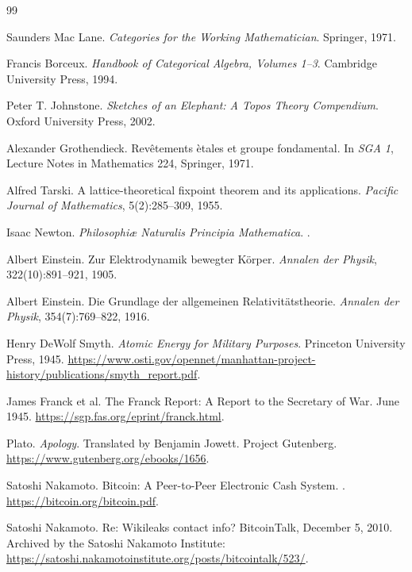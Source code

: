 \documentclass[11pt]{article}
\theoremstyle{definition}
\theoremstyle{plain}
\begin{document}
\begin{thebibliography}{99}

Saunders Mac Lane.
\newblock \emph{Categories for the Working Mathematician}.
\newblock Springer, 1971.

Francis Borceux.
\newblock \emph{Handbook of Categorical Algebra, Volumes 1--3}.
\newblock Cambridge University Press, 1994.

Peter T. Johnstone.
\newblock \emph{Sketches of an Elephant: A Topos Theory Compendium}.
\newblock Oxford University Press, 2002.

Alexander Grothendieck.
\newblock Rev\^etements \`etales et groupe fondamental.
\newblock In \emph{SGA 1}, Lecture Notes in Mathematics 224, Springer, 1971.

Alfred Tarski.
\newblock A lattice-theoretical fixpoint theorem and its applications.
\newblock \emph{Pacific Journal of Mathematics}, 5(2):285--309, 1955.

Isaac Newton.
\newblock \emph{Philosophi\ae{} Naturalis Principia Mathematica}.
.

Albert Einstein.
\newblock Zur Elektrodynamik bewegter K\"orper.
\newblock \emph{Annalen der Physik}, 322(10):891--921, 1905.

Albert Einstein.
\newblock Die Grundlage der allgemeinen Relativit\"atstheorie.
\newblock \emph{Annalen der Physik}, 354(7):769--822, 1916.

Henry DeWolf Smyth.
\newblock \emph{Atomic Energy for Military Purposes}.
\newblock Princeton University Press, 1945.
\newblock \url{https://www.osti.gov/opennet/manhattan-project-history/publications/smyth_report.pdf}.

James Franck et al.
\newblock The Franck Report: A Report to the Secretary of War.
\newblock June 1945.
\newblock \url{https://sgp.fas.org/eprint/franck.html}.

Plato.
\newblock \emph{Apology}.
\newblock Translated by Benjamin Jowett.
\newblock Project Gutenberg.
\newblock \url{https://www.gutenberg.org/ebooks/1656}.

Satoshi Nakamoto.
\newblock Bitcoin: A Peer-to-Peer Electronic Cash System.
.
\newblock \url{https://bitcoin.org/bitcoin.pdf}.

Satoshi Nakamoto.
\newblock Re: Wikileaks contact info?
\newblock BitcoinTalk, December 5, 2010.
\newblock Archived by the Satoshi Nakamoto Institute:
\url{https://satoshi.nakamotoinstitute.org/posts/bitcointalk/523/}.


\end{thebibliography}
\end{document}
